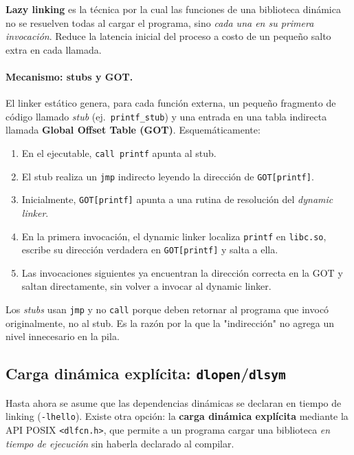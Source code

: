 \documentclass[11pt,a4paper]{article}
\begin{document}
\begin{definicion}
\textbf{Lazy linking} es la técnica por la cual las funciones de una
biblioteca dinámica no se resuelven todas al cargar el programa,
sino \emph{cada una en su primera invocación}. Reduce la latencia
inicial del proceso a costo de un pequeño salto extra en cada
llamada.
\end{definicion}

\paragraph{Mecanismo: stubs y GOT.}
El linker estático genera, para cada función externa, un pequeño
fragmento de código llamado \emph{stub} (ej.\ \texttt{printf\_stub}) y
una entrada en una tabla indirecta llamada \textbf{Global Offset
Table (GOT)}. Esquemáticamente:

\begin{enumerate}[leftmargin=*]
    \item En el ejecutable, \texttt{call printf} apunta al stub.
    \item El stub realiza un \texttt{jmp} indirecto leyendo la
        dirección de \texttt{GOT[printf]}.
    \item Inicialmente, \texttt{GOT[printf]} apunta a una rutina de
        resolución del \emph{dynamic linker}.
    \item En la primera invocación, el dynamic linker localiza
        \texttt{printf} en \texttt{libc.so}, escribe su dirección
        verdadera en \texttt{GOT[printf]} y salta a ella.
    \item Las invocaciones siguientes ya encuentran la dirección
        correcta en la GOT y saltan directamente, sin volver a
        invocar al dynamic linker.
\end{enumerate}

\begin{idea}
Los \emph{stubs} usan \texttt{jmp} y no \texttt{call} porque deben
retornar al programa que invocó originalmente, no al stub. Es la
razón por la que la "indirección" no agrega un nivel innecesario en
la pila.
\end{idea}

\subsection{Carga dinámica explícita: \texttt{dlopen}/\texttt{dlsym}}

Hasta ahora se asume que las dependencias dinámicas se declaran en
tiempo de linking (\texttt{-lhello}). Existe otra opción: la
\textbf{carga dinámica explícita} mediante la API POSIX
\texttt{<dlfcn.h>}, que permite a un programa cargar una biblioteca
\emph{en tiempo de ejecución} sin haberla declarado al compilar.
\end{document}
